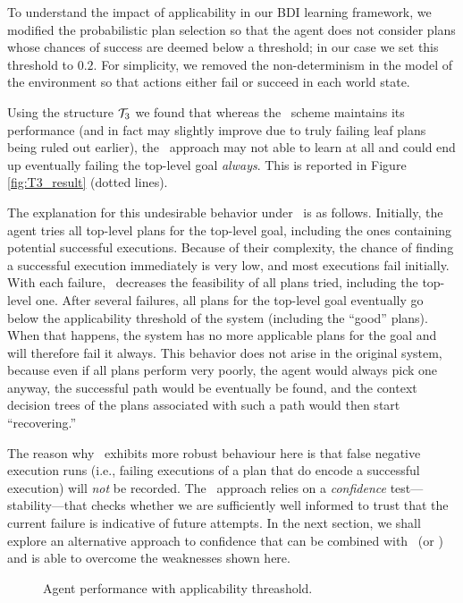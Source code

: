 To understand the impact of applicability in our BDI learning framework, we
modified the probabilistic plan selection so that the agent does not consider
plans whose chances of success are deemed below a threshold; in our case we set
this threshold to $0.2$.
For simplicity, we  removed the non-determinism in the model of the
environment so that actions either fail or succeed in each world state.

Using the structure ${\mathcal{T}}_3$ we found that whereas the \BUL\ scheme maintains its
performance (and in fact may slightly improve due to truly failing leaf plans
being ruled out earlier), the \CL\ approach may not able to learn at all and
could end up eventually failing the top-level goal \emph{always}. This is
reported in Figure \ref{fig:T3_result} (dotted lines).

The explanation for this undesirable behavior under \CL\ is as follows.
Initially, the agent tries all top-level plans for the top-level goal, including
the ones containing potential successful executions. Because of their complexity,
the chance of finding a successful execution immediately is very low, and most
executions fail initially. With each failure, \CL\ decreases the feasibility of
all plans tried, including the top-level one.  After several failures, all plans
for the top-level goal eventually go below the applicability threshold of the
system (including the ``good'' plans). When that happens, the system has no more
applicable plans for the goal and will therefore fail it always.
This behavior does not arise in the original system, because even if all plans
perform very poorly, the agent would always pick one anyway, the successful path
would be eventually be found, and the context decision trees of the plans
associated with such a path would then start ``recovering.''


The reason why \BUL\ exhibits more robust behaviour here is that false negative
execution runs (i.e., failing executions of a plan that do encode a successful
execution) will \emph{not} be recorded.
The \BUL\ approach relies on a \emph{confidence} test---stability---that checks
whether we are sufficiently well informed to trust that the current failure is
indicative of future attempts.
In the next section, we shall explore an alternative approach to confidence that
can be combined with \CL\ (or \BUL) and is able to overcome the weaknesses shown
here.




\begin{figure}[t]
   \centering
   
   \caption{Agent performance with applicability threashold.}
   \label{fig:performance-applicability}
\end{figure}
